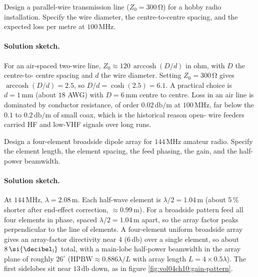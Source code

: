 \begin{exercise}
Design a parallel-wire transmission line ($Z_{0} = 300\,\si{\ohm}$)
for a hobby radio installation. Specify the wire diameter, the
centre-to-centre spacing, and the expected loss per metre at $100\,\si{
\mega\hertz}$.
\paragraph{Solution sketch.} For an air-spaced two-wire line, $Z_{0}
\approx 120\,\operatorname{arccosh}(D/d)$ in ohm, with $D$ the centre-to-
centre spacing and $d$ the wire diameter. Setting $Z_{0} = 300\,\si{
\ohm}$ gives $\operatorname{arccosh}(D/d) = 2.5$, so $D/d = \cosh(2.5) =
6.1$. A practical choice is $d = 1\,\si{\milli\meter}$ (about $18$ AWG)
with $D = 6\,\si{\milli\meter}$ centre to centre. Loss in an air line is
dominated by conductor resistance, of order $0.02\,\si{\decibel\per
\meter}$ at $100\,\si{\mega\hertz}$, far below the $0.1$ to $0.2\,\si{
\decibel\per\meter}$ of small coax, which is the historical reason open-
wire feeders carried HF and low-VHF signals over long runs.
\end{exercise}

\begin{exercise}
Design a four-element broadside dipole array for $144\,\si{\mega
\hertz}$ amateur radio. Specify the element length, the element
spacing, the feed phasing, the gain, and the half-power beamwidth.
\paragraph{Solution sketch.} At $144\,\si{\mega\hertz}$, $\lambda =
2.08\,\si{\meter}$. Each half-wave element is $\lambda/2 = 1.04\,\si{
\meter}$ (about $5\,\%$ shorter after end-effect correction, $\approx
0.99\,\si{\meter}$). For a broadside pattern feed all four elements in
phase, spaced $\lambda/2 = 1.04\,\si{\meter}$ apart, so the array factor
peaks perpendicular to the line of elements. A four-element uniform
broadside array gives an array-factor directivity near $4$ ($6\,\si{
\decibel}$) over a single element, so about
$8\,\si{\decibel\textsubscript{i}}$ total, with a main-lobe half-power
beamwidth in the array
plane of roughly $26^{\circ}$ ($\text{HPBW}\approx 0.886\lambda/L$ with
array length $L = 4\times 0.5\lambda$). The first sidelobes sit near
$13\,\si{\decibel}$ down, as in figure
\ref{fig:vol04ch10:gain-pattern}.
\end{exercise}

